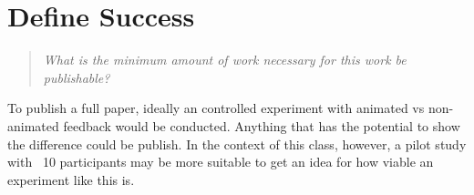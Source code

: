 \documentclass{proc}
\begin{document}
	\section{Define Success}
	\begin{quote}
		\textit{What is the minimum amount of work necessary for this work be publishable?}
	\end{quote}
	To publish a full paper, ideally an controlled experiment with animated vs non-animated feedback would be conducted. Anything that has the potential to show the difference could be publish. In the context of this class, however, a pilot study with ~10 participants may be more suitable to get an idea for how viable an experiment like this is. 
	
	
\end{document}
